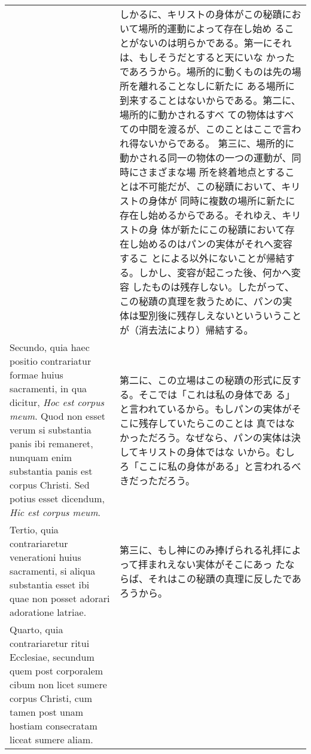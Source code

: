 \documentclass[10pt]{jsarticle} %
\begin{document}
\begin{longtable}{p{21em}p{21em}}
&

しかるに、キリストの身体がこの秘蹟において場所的運動によって存在し始め
ることがないのは明らかである。第一にそれは、もしそうだとすると天にいな
かったであろうから。場所的に動くものは先の場所を離れることなしに新たに
ある場所に到来することはないからである。第二に、場所的に動かされるすべ
ての物体はすべての中間を渡るが、このことはここで言われ得ないからである。
第三に、場所的に動かされる同一の物体の一つの運動が、同時にさまざまな場
所を終着地点とすることは不可能だが、この秘蹟において、キリストの身体が
同時に複数の場所に新たに存在し始めるからである。それゆえ、キリストの身
体が新たにこの秘蹟において存在し始めるのはパンの実体がそれへ変容するこ
とによる以外にないことが帰結する。しかし、変容が起こった後、何かへ変容
したものは残存しない。したがって、この秘蹟の真理を救うために、パンの実
体は聖別後に残存しえないといういうことが（消去法により）帰結する。


\\



Secundo, quia haec positio contrariatur formae huius sacramenti, in
qua dicitur, {\itshape Hoc est corpus meum}. Quod non esset verum si
substantia panis ibi remaneret, nunquam enim substantia panis est
corpus Christi. Sed potius esset dicendum, {\itshape Hic est corpus
meum}.


&

第二に、この立場はこの秘蹟の形式に反する。そこでは「これは私の身体であ
る」と言われているから。もしパンの実体がそこに残存していたらこのことは
真ではなかっただろう。なぜなら、パンの実体は決してキリストの身体ではな
いから。むしろ「ここに私の身体がある」と言われるべきだっただろう。


\\



Tertio, quia contrariaretur venerationi huius sacramenti, si aliqua
substantia esset ibi quae non posset adorari adoratione latriae.


&


第三に、もし神にのみ捧げられる礼拝によって拝まれえない実体がそこにあっ
たならば、それはこの秘蹟の真理に反したであろうから。

\\



Quarto, quia contrariaretur ritui Ecclesiae, secundum quem post
corporalem cibum non licet sumere corpus Christi, cum tamen post unam
hostiam consecratam liceat sumere aliam.

&


\end{longtable}
\end{document}
